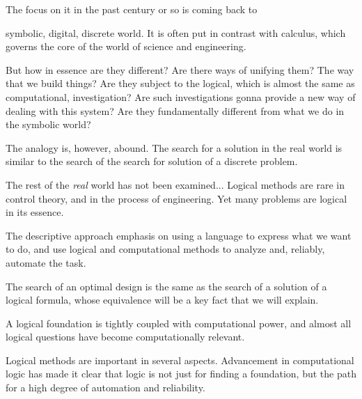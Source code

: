 \documentclass[10pt]{article}
\theoremstyle{definition}
\begin{document}
 The focus on it in the past century or so is coming back to 


 symbolic, digital, discrete world. It is often put in contrast with calculus, which governs the core of the world of science and engineering. 

But how in essence are they different? Are there ways of unifying them? The way that we build things? Are they subject to the logical, which is almost the same as computational, investigation? Are such investigations gonna provide a new way of dealing with this system? Are they fundamentally different from what we do in the symbolic world? 

The analogy is, however, abound. The search for a solution in the real world is similar to the search of the search for solution of a discrete problem. 

The rest of the {\em real} world has not been examined... Logical methods are rare in control theory, and in the process of engineering. Yet many problems are logical in its essence. 

The descriptive approach emphasis on using a language to express what we want to do, and use logical and computational methods to analyze and, reliably, automate the task. 

The search of an optimal design is the same as the search of a solution of a logical formula, whose equivalence will be a key fact that we will explain. 

A logical foundation is tightly coupled with computational power, and almost all logical questions have become computationally relevant. 

Logical methods are important in several aspects. Advancement in computational logic has made it clear that logic is not just for finding a foundation, but the path for a high degree of automation and reliability. 
\end{document}
